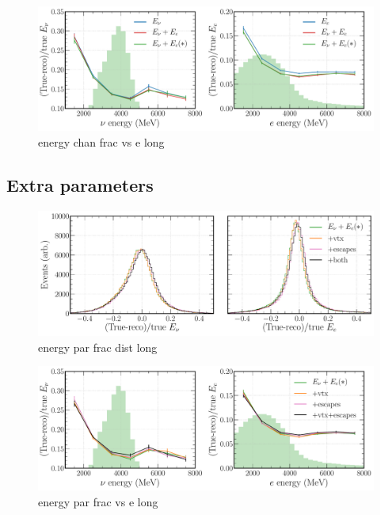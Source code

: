 \begin{figure} %
    \includegraphics[width=\textwidth]{diagrams/7-cvn/chipsnet/energy_chan_frac_vs_e.pdf}
    \caption[energy chan frac vs e short]
    {energy chan frac vs e long}
    \label{fig:energy_chan_frac_vs_e}
\end{figure}

\subsection{Extra parameters} %
\label{sec:cvn_energy_par} %

\begin{figure} %
    \includegraphics[width=\textwidth]{diagrams/7-cvn/chipsnet/energy_par_frac_dist.pdf}
    \caption[energy par frac dist short]
    {energy par frac dist long}
    \label{fig:energy_par_frac_dist}
\end{figure}

\begin{figure} %
    \includegraphics[width=\textwidth]{diagrams/7-cvn/chipsnet/energy_par_frac_vs_e.pdf}
    \caption[energy par frac vs e short]
    {energy par frac vs e long}
    \label{fig:energy_par_frac_vs_e}
\end{figure}


